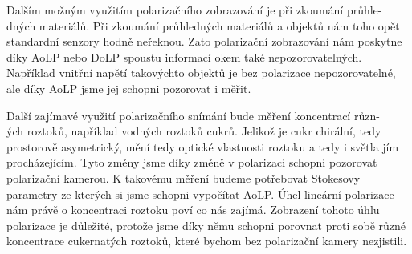 \documentclass[a4paper]{article}
\numberwithin{equation}{section}
\begin{document}
    \par Dalším možným využitím polarizačního zobrazování je při zkoumání průhle-
    \\dných materiálů. Při zkoumání průhledných materiálů a objektů nám toho opět standardní senzory hodně neřeknou. Zato polarizační zobrazování nám poskytne díky AoLP nebo DoLP spoustu informací okem také nepozorovatelných. Například vnitřní napětí takovýchto objektů je bez polarizace nepozorovatelné, ale díky AoLP jsme jej schopni pozorovat i měřit.\footnotemark[2]
    \par Další zajímavé využití polarizačního snímání bude měření koncentrací různ-\\ých roztoků, například vodných roztoků cukrů. Jelikož je cukr chirální, tedy prostorově asymetrický, mění tedy optické vlastnosti roztoku a tedy i světla jím procházejícím. \cite{chiralita} Tyto změny jsme díky změně v polarizaci schopni pozorovat polarizační kamerou. K takovému měření budeme potřebovat Stokesovy parametry ze kterých si jsme schopni vypočítat AoLP. Úhel lineární polarizace nám právě o koncentraci roztoku poví co nás zajímá. Zobrazení tohoto úhlu polarizace je důležité, protože jsme díky němu schopni porovnat proti sobě různé koncentrace cukernatých roztoků, které bychom bez polarizační kamery nezjistili.\footnotemark[3]
\end{document}
